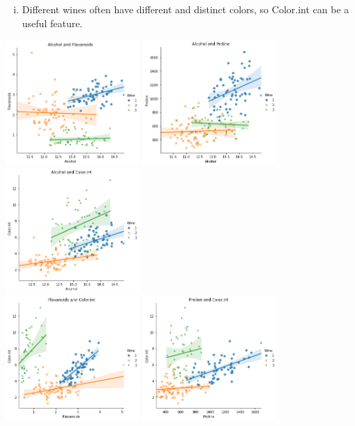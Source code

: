 \documentclass[12pt]{article}
\begin{document}
\begin{enumerate}[(1)]
\begin{mdframed}
\begin{enumerate}[(i)]
            \item Different wines often have different and distinct colors, so Color.int can be a useful feature.
        \end{enumerate}
        \begin{center}
        \includegraphics[width = 2in]{Alcohol_Flavanoids.png}
        \includegraphics[width = 2in]{Alcohol_Proline.png}
        \includegraphics[width = 2in]{Alcohol_Colorint.png} \\
        \includegraphics[width = 2in]{Flavanoids_Colorint.png}
        \includegraphics[width = 2in]{Proline_Colorint.png}

\end{center}
\end{mdframed}
\end{enumerate}
\end{document}
